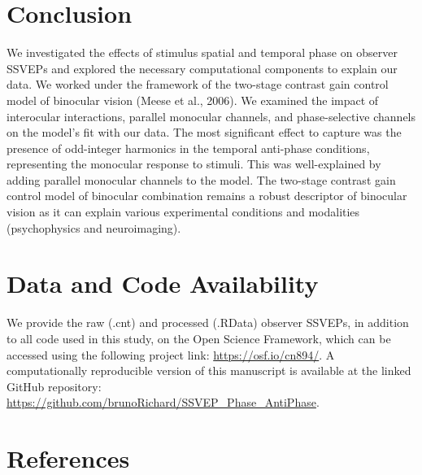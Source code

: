 \documentclass[
  12pt,
]{article}
\begin{document}
\section{Conclusion}\label{conclusion}

We investigated the effects of stimulus spatial and temporal phase on
observer SSVEPs and explored the necessary computational components to
explain our data. We worked under the framework of the two-stage
contrast gain control model of binocular vision (Meese et al., 2006). We
examined the impact of interocular interactions, parallel monocular
channels, and phase-selective channels on the model's fit with our data.
The most significant effect to capture was the presence of odd-integer
harmonics in the temporal anti-phase conditions, representing the
monocular response to stimuli. This was well-explained by adding
parallel monocular channels to the model. The two-stage contrast gain
control model of binocular combination remains a robust descriptor of
binocular vision as it can explain various experimental conditions and
modalities (psychophysics and neuroimaging).

\section{Data and Code Availability}\label{data-and-code-availability}

We provide the raw (.cnt) and processed (.RData) observer SSVEPs, in
addition to all code used in this study, on the Open Science Framework,
which can be accessed using the following project link:
\url{https://osf.io/cn894/}. A computationally reproducible version of
this manuscript is available at the linked GitHub repository:
\url{https://github.com/brunoRichard/SSVEP_Phase_AntiPhase}.

\section*{References}\label{references}
\end{document}
